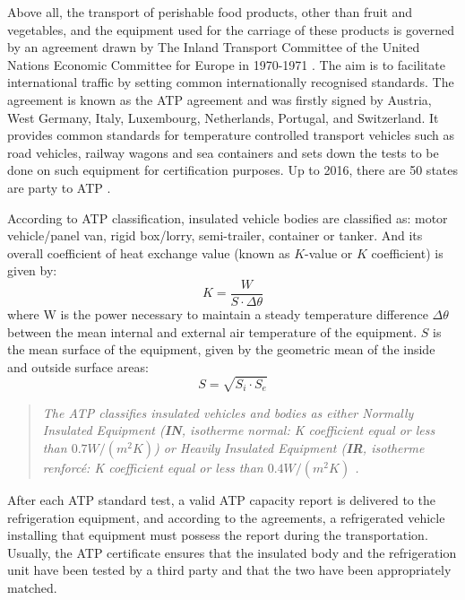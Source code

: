 Above all, the transport of perishable food products, other than fruit and vegetables, and the equipment used for the carriage of these products is governed by an agreement drawn by The Inland Transport Committee of the United Nations Economic Committee for Europe in 1970-1971 \citep{Geneva1970}. The aim is to facilitate international traffic by setting common internationally recognised standards. The agreement is known as the ATP agreement and was firstly signed by Austria, West Germany, Italy, Luxembourg, Netherlands, Portugal, and Switzerland.  It provides common standards for temperature controlled transport vehicles such as road vehicles, railway wagons and sea containers and sets down the tests to be done on such equipment for certification purposes. Up to 2016, there are 50 states are party to ATP \citep{ATP_wiki}.


According to ATP classification, insulated vehicle bodies are classified as: motor vehicle/panel van, rigid box/lorry, semi-trailer, container or tanker. And its overall coefficient of heat exchange value (known as $K$-value or $K$ coefficient) is given by:
\begin{equation}
K = \frac{W}{S\cdot \Delta \theta}
\end{equation}
where W is  the  power  necessary  to  maintain  a  steady  temperature  difference $\Delta \theta$ between  the  mean internal and external air temperature of the equipment. $S$ is the mean surface of the equipment, given by the geometric mean of the inside and outside surface areas:
\begin{equation}
S = \sqrt{S_i \cdot S_e}
\end{equation}

\begin{quote}
	\textit{The ATP classifies insulated vehicles and bodies as either Normally Insulated Equipment (\textbf{IN}, isotherme normal: K coefficient equal or less than $ 0.7 W/(m^2 K) $) or Heavily Insulated Equipment (\textbf{IR}, isotherme renforcé: K coefficient equal or less than $ 0.4 W/(m^2 K )$ \citep{Tassou2009}.}
\end{quote}

After each ATP standard test, a valid ATP capacity report is delivered to the refrigeration equipment, and according to the agreements, a refrigerated vehicle installing that equipment must possess the report during the transportation. Usually, the ATP certificate ensures that the insulated body and the refrigeration unit have been tested by a third party and that the two have been appropriately matched.


